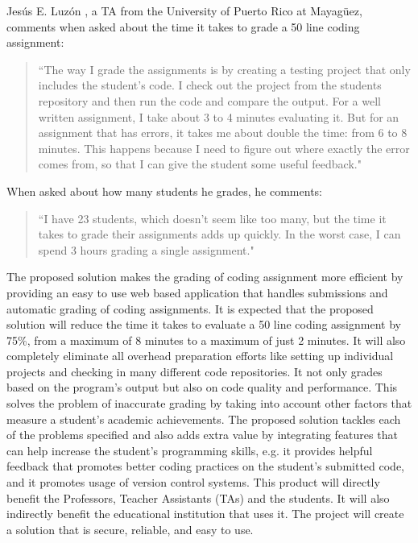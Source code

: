 Jesús E. Luzón \cite{Chiki}, a TA from the University of Puerto Rico at
Mayagüez, comments when asked about the time it takes to grade a 50 line coding
assignment: \begin{quote} ``The way I grade the assignments is by creating a
testing project that only includes the student's code. I check out the project
from the students repository and then run the code and compare the output. For a
well written assignment, I take about 3 to 4 minutes evaluating it. But for an
assignment that has errors, it takes me about double the time: from 6 to 8
minutes. This happens because I need to figure out where exactly the error comes
from, so that I can give the student some useful feedback." \end{quote} When
asked about how many students he grades, he comments: \begin{quote} ``I have 23
students, which doesn't seem like too many, but the time it takes to grade their
assignments adds up quickly. In the worst case, I can spend 3 hours grading a
single assignment." \end{quote}


The proposed solution makes the grading of coding assignment more efficient by
providing an easy to use web based application that handles submissions and
automatic grading of coding assignments. It is expected that the proposed solution will
reduce the time it takes to evaluate a 50 line coding assignment by 75\%, from a
maximum of 8 minutes to a maximum of just 2 minutes. It will also completely
eliminate all overhead preparation efforts like setting up individual projects
and checking in many different code repositories. It not only grades based on
the program's output but also on code quality and performance. This solves the
problem of inaccurate grading by taking into account other factors that measure
a student's academic achievements. The proposed solution tackles each of the problems
specified and also adds extra value by integrating features that can help
increase the student's programming skills, e.g. it provides helpful feedback
that promotes better coding practices on the student's submitted code, and it
promotes usage of version control systems. This product will directly benefit
the Professors, Teacher Assistants (TAs) and the students. It will also
indirectly benefit the educational institution that uses it. The project will
create a solution that is secure, reliable, and easy to use.
